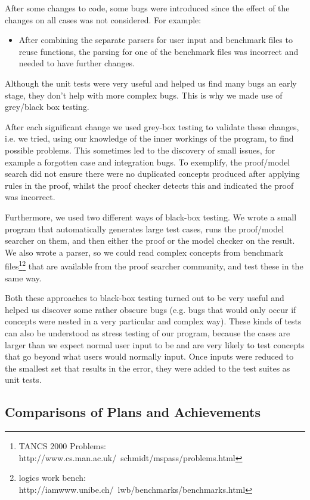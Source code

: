 After some changes to code, some bugs were introduced since the effect of the changes on all cases was not considered. For example:

\begin{itemize}
\item After combining the separate parsers for user input and benchmark files to reuse functions, the parsing for one of the benchmark files was incorrect and needed to have further changes.
\end{itemize}

Although the unit tests were very useful and helped us find many bugs an early stage, they don't help with more complex bugs. This is why we made use of grey/black box testing.

After each significant change we used grey-box testing to validate these changes, i.e. we tried, using our knowledge of the inner workings of the program, to find possible problems. This sometimes led to the discovery of small issues, for example a forgotten case and integration bugs. To exemplify, the proof/model search did not ensure there were no duplicated concepts produced after applying rules in the proof, whilst the proof checker detects this and indicated the proof was incorrect.

Furthermore, we used two different ways of black-box testing. We wrote a small program that automatically generates large test cases, runs the proof/model searcher on them, and then either the proof or the model checker on the result. We also wrote a parser, so we could read complex concepts from benchmark files\footnote{TANCS 2000 Problems: http://www.cs.man.ac.uk/~schmidt/mspass/problems.html}\footnote{logics work bench: http://iamwww.unibe.ch/~lwb/benchmarks/benchmarks.html} that are available from the proof searcher community, and test these in the same way.

Both these approaches to black-box testing turned out to be very useful and helped us discover some rather obscure bugs (e.g. bugs that would only occur if concepts were nested in a very particular and complex way). These kinds of tests can also be understood as stress testing of our program, because the cases are larger than we expect normal user input to be and are very likely to test concepts that go beyond what users would normally input. Once inputs were reduced to the smallest set that results in the error, they were added to the test suites as unit tests.

\subsection{Comparisons of Plans and Achievements}

